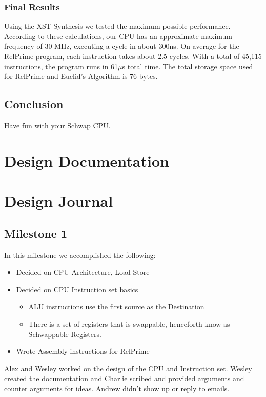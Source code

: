 \documentclass{report}
\begin{document}
		\subsection{Final Results}
			Using the XST Synthesis we tested the maximum possible performance. According to these calculations, our CPU has an approximate maximum frequency of 30 MHz, executing a cycle in about 300ns. On average for the RelPrime program, each instruction takes about 2.5 cycles. With a total of 45,115 instructions, the program runs in 61$\mu$s total time. The total storage space used for RelPrime and Euclid's Algorithm is 76 bytes.
	\section{Conclusion}
		Have fun with your Schwap CPU.
\chapter{Design Documentation}
	
\chapter{Design Journal}
	\section{Milestone 1}
		In this milestone we accomplished the following:
		\begin{itemize}
			\item Decided on CPU Architecture, Load-Store
			\item Decided on CPU Instruction set basics
			\begin{itemize}
				\item ALU instructions use the first source as the Destination
				\item There is a set of registers that is swappable, henceforth know as Schwappable Registers.
			\end{itemize}
			\item Wrote Assembly instructions for RelPrime
		\end{itemize}
		Alex and Wesley worked on the design of the CPU and Instruction set. Wesley created the documentation and Charlie scribed and provided arguments and counter arguments for ideas.  Andrew didn't show up or reply to emails.
\end{document}
